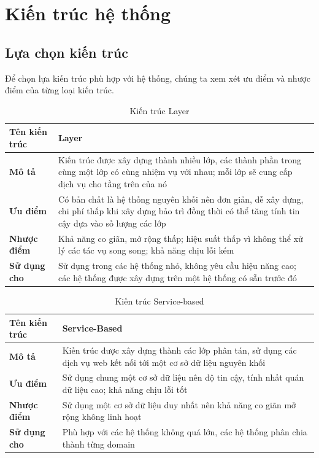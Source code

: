 
\section{Kiến trúc hệ thống}
\subsection{Lựa chọn kiến trúc}
 
\hspace*{0.5cm}Để chọn lựa kiến trúc phù hợp với hệ thống, chúng ta xem xét ưu điểm và nhược điểm của từng loại kiến trúc.\\
 
\begin{table}[h]
    \begin{tabular}{|p{3cm}|p{12cm}|}
        \hline
        \textbf{Tên kiến trúc} & Layer\\
        \hline
        \textbf{Mô tả}         & Kiến trúc được xây dựng thành nhiều lớp, các thành phần trong cùng một lớp có cùng nhiệm vụ với nhau; mỗi lớp sẽ cung cấp dịch vụ cho tầng trên của nó \\
        \hline
        \textbf{Ưu điểm}       & Có bản chất là hệ thống nguyên khối nên đơn giản, dễ xây dựng, chi phí thấp khi xây dựng bảo trì đồng thời có thể tăng tính tin cậy dựa vào số lượng các lớp \\
        \hline
        \textbf{Nhược điểm}    & Khả năng co giãn, mở rộng thấp; hiệu suất thấp vì không thể xử lý các tác vụ song song; khả năng chịu lỗi kém\\
        \hline
        \textbf{Sử dụng cho}   & Sử dụng trong các hệ thống nhỏ, không yêu cầu hiệu năng cao; các hệ thống được xây dựng trên một hệ thống có sẵn trước đó \\
        \hline
    \end{tabular}
    \caption{Kiến trúc Layer}
\end{table}
 
\begin{table}[h]
    \begin{tabular}{|p{3cm}|p{12cm}|}
        \hline
        \textbf{Tên kiến trúc} & Service-Based\\
        \hline
        \textbf{Mô tả}         & Kiến trúc được xây dựng thành các lớp phân tán, sử dụng các dịch vụ web kết nối tới một cơ sở dữ liệu nguyên khối     \\
        \hline
        \textbf{Ưu điểm}       & Sử dụng chung một cơ sở dữ liệu nên độ tin cậy, tính nhất quán dữ liệu cao; khả năng chịu lỗi tốt \\
        \hline
        \textbf{Nhược điểm}    & Sử dụng một cơ sở dữ liệu duy nhất nên khả năng co giãn mở rộng không linh hoạt   \\
        \hline
        \textbf{Sử dụng cho}   & Phù hợp với các hệ thống không quá lớn, các hệ thống phân chia thành từng domain                   \\
        \hline
    \end{tabular}
    \caption{Kiến trúc Service-based}
\end{table}
 
